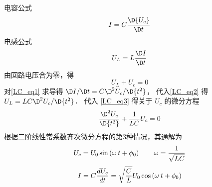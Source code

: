 
电容公式
\begin{equation}\label{LC_eq1}
I = C\frac{\D {U_c}}{\D t}
\end{equation}
电感公式
\begin{equation}\label{LC_eq2}
{U_L} = L\frac{\D I}{\D t}
\end{equation}
由回路电压合为零，得
\begin{equation}\label{LC_eq3}
{U_L} + {U_c} = 0
\end{equation}
对\autoref{LC_eq1} 求导得 ${\D I}/{\D t} = C{{{\D^2}{U_c}}}/{{\D{t^2}}}$， 代入\autoref{LC_eq2} 得 ${U_L} = LC {{{\D^2}{U_c}}}/{{\D{t^2}}}$． 代入  \autoref{LC_eq3}  得关于 ${U_c}$ 的微分方程
\begin{equation}
\frac{{\D^2}{U_c}}{\D{t^2}} + \frac{1}{LC}{U_c} = 0
\end{equation}
根据二阶线性常系数齐次微分方程的第3种情况，其通解为
\begin{equation}
{U_c} = {U_0}\sin \left( {\omega {\kern 1pt} {\kern 1pt} t + {\phi_0}} \right)
\qquad
\omega  = \frac{1}{\sqrt {LC} }
\end{equation}
\begin{equation}
I = C\frac{d{U_c}}{dt} = \sqrt {\frac{C}{L}} {U_0}\cos \left( {\omega {\kern 1pt} {\kern 1pt} t + {\phi_0}} \right)
\end{equation}
 
